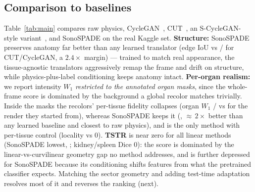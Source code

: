 \documentclass[runningheads]{llncs}
\begin{document}
\subsection{Comparison to baselines}
\label{sec:baselines}
Table~\ref{tab:main} compares raw physics, CycleGAN~\cite{zhu2017cyclegan}, CUT~\cite{park2020cut}, an
S-CycleGAN-style variant~\cite{song2024scyclegan}, and SonoSPADE on the real Kaggle set.
\textbf{Structure:} SonoSPADE preserves anatomy far better than any learned translator (edge IoU
\iouSono{} vs \iouCUT{}/\iouCyc{} for CUT/CycleGAN, a $2.4\times$ margin) --- trained to match real
appearance, the tissue-agnostic translators aggressively remap the frame and drift on structure, while
physics-plus-label conditioning keeps anatomy intact. \textbf{Per-organ realism:} we report intensity
$W_1$ \emph{restricted to the annotated organ masks}, since the whole-frame score is dominated by the
background a global recolor matches trivially. Inside the masks the recolors' per-tissue fidelity
collapses (organ $W_1$ \wCyc{}/\wCUT{} vs \wPhys{} for the render they started from), whereas SonoSPADE
keeps it (\wSono{}, ${\approx}\,2\times$ better than any learned baseline and closest to raw physics),
and is the only method with per-tissue control (locality \locSono{} vs $0$). \textbf{TSTR} is near zero
for all linear methods (SonoSPADE lowest, \tstrSono{}; kidney/spleen Dice $0$): the score is dominated
by the linear-vs-curvilinear geometry gap no method addresses, and is further depressed for SonoSPADE
because its conditioning shifts features from what the pretrained classifier expects. Matching the
sector geometry and adding test-time adaptation resolves most of it and reverses the ranking (next).
\end{document}
